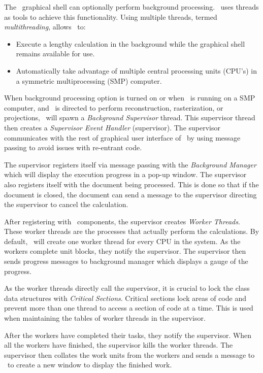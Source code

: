 The \ctsim\ graphical shell can optionally perform background
processing. \ctsim\ uses threads as tools to achieve this
functionality. Using multiple threads, termed
\emph{multithreading}, allows \ctsim\ to:

\begin{itemize}
\item Execute a lengthy calculation in the background while the graphical shell remains
available for use.
\item Automatically take advantage of multiple central processing units (CPU's) in a
symmetric multiprocessing (SMP) computer.
\end{itemize}

When background processing option is turned on or when \ctsim\ is
running on a SMP computer, and \ctsim\ is directed to perform
reconstruction, rasterization, or projections, \ctsim\ will spawn
a \emph{Background Supervisor} thread. This supervisor thread then
creates a \emph{Supervisor Event Handler} (supervisor).  The
supervisor communicates with the rest of graphical user interface
of  \ctsim\ by using message passing to avoid issues with
re-entrant code.

The supervisor registers itself via message passing with the
\emph{Background Manager} which will display the execution
progress in a pop-up window. The supervisor also registers itself
with the document being processed. This is done so that if the
document is closed, the document can send a message to the
supervisor directing the supervisor to cancel the calculation.

After registering with \ctsim\ components, the supervisor creates
\emph{Worker Threads}. These worker threads are the processes that
actually perform the calculations. By default, \ctsim\ will create
one worker thread for every CPU in the system. As the workers
complete unit blocks, they notify the supervisor. The supervisor
then sends progress messages to background manager which displays
a gauge of the progress.

As the worker threads directly call the supervisor, it is crucial
to lock the class data structures with \emph{Critical Sections}.
Critical sections lock areas of code and prevent more than one
thread to access a section of code at a time. This is used when
maintaining the tables of worker threads in the supervisor.

After the workers have completed their tasks, they notify the
supervisor. When all the workers have finished, the supervisor
kills the worker threads. The supervisor then collates the work
units from the workers and sends a message to \ctsim\ to create a
new window to display the finished work.

